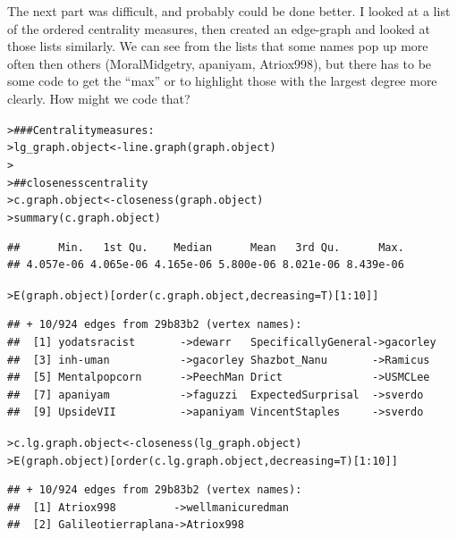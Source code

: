 \documentclass[12pt]{article}\usepackage[]{graphicx}\usepackage[]{color}
\makeatletter
\newcommand{\hlnum}[1]{\textcolor[rgb]{0.82,0.78,0.62}{#1}}%
\newcommand{\hlcom}[1]{\textcolor[rgb]{0.404,0.408,0.42}{#1}}%
\newcommand{\hlopt}[1]{\textcolor[rgb]{0.882,0.878,0.898}{#1}}%
\newcommand{\hlstd}[1]{\textcolor[rgb]{0.882,0.878,0.898}{#1}}%
\newcommand{\hlkwb}[1]{\textcolor[rgb]{0.902,0.675,0.196}{#1}}%
\newcommand{\hlkwc}[1]{\textcolor[rgb]{0.812,0.522,0.388}{#1}}%
\newcommand{\hlkwd}[1]{\textcolor[rgb]{0.733,0.388,0.812}{#1}}%
\newenvironment{kframe}{%
 \def\at@end@of@kframe{}%
 \ifinner\ifhmode%
  \def\at@end@of@kframe{\end{minipage}}%
  \begin{minipage}{\columnwidth}%
 \fi\fi%
 \def\FrameCommand##1{\hskip\@totalleftmargin \hskip-\fboxsep
 \colorbox{shadecolor}{##1}\hskip-\fboxsep
     \hskip-\linewidth \hskip-\@totalleftmargin \hskip\columnwidth}%
 \MakeFramed {\advance\hsize-\width
   \@totalleftmargin\z@ \linewidth\hsize
   \@setminipage}}%
 {\par\unskip\endMakeFramed%
 \at@end@of@kframe}
\newenvironment{knitrout}{}{} %
\makeatother
\begin{document}
\begin{flushleft}
The next part was difficult, and probably could be done better. I looked at a list of the ordered centrality measures, then created an edge-graph and looked at those lists similarly. We can see from the lists that some names pop up more often then others (MoralMidgetry, apaniyam, Atriox998), but there has to be some code to get the ``max'' or to highlight those with the largest degree more clearly. How might we code that? 

\begin{knitrout}
\color{fgcolor}\begin{kframe}
\begin{alltt}
\hlstd{> }\hlcom{### Centrality measures:}
\hlstd{> }\hlstd{lg_graph.object} \hlkwb{<-} \hlkwd{line.graph}\hlstd{(graph.object)}
\hlstd{> }
\hlstd{> }\hlcom{## closeness centrality}
\hlstd{> }\hlstd{c.graph.object} \hlkwb{<-} \hlkwd{closeness}\hlstd{(graph.object)}
\hlstd{> }\hlkwd{summary}\hlstd{(c.graph.object)}
\end{alltt}
\begin{verbatim}
##      Min.   1st Qu.    Median      Mean   3rd Qu.      Max. 
## 4.057e-06 4.065e-06 4.165e-06 5.800e-06 8.021e-06 8.439e-06
\end{verbatim}
\begin{alltt}
\hlstd{> }\hlkwd{E}\hlstd{(graph.object)[}\hlkwd{order}\hlstd{(c.graph.object,} \hlkwc{decreasing}\hlstd{=T)[}\hlnum{1}\hlopt{:}\hlnum{10}\hlstd{]]}
\end{alltt}
\begin{verbatim}
## + 10/924 edges from 29b83b2 (vertex names):
##  [1] yodatsracist       ->dewarr   SpecificallyGeneral->gacorley
##  [3] inh-uman           ->gacorley Shazbot_Nanu       ->Ramicus 
##  [5] Mentalpopcorn      ->PeechMan Drict              ->USMCLee 
##  [7] apaniyam           ->faguzzi  ExpectedSurprisal  ->sverdo  
##  [9] UpsideVII          ->apaniyam VincentStaples     ->sverdo
\end{verbatim}
\begin{alltt}
\hlstd{> }\hlstd{c.lg.graph.object} \hlkwb{<-} \hlkwd{closeness}\hlstd{(lg_graph.object)}
\hlstd{> }\hlkwd{E}\hlstd{(graph.object)[}\hlkwd{order}\hlstd{(c.lg.graph.object,} \hlkwc{decreasing}\hlstd{=T)[}\hlnum{1}\hlopt{:}\hlnum{10}\hlstd{]]}
\end{alltt}
\begin{verbatim}
## + 10/924 edges from 29b83b2 (vertex names):
##  [1] Atriox998         ->wellmanicuredman  
##  [2] Galileotierraplana->Atriox998         

\end{verbatim}
\end{kframe}
\end{knitrout}
\end{flushleft}
\end{document}
